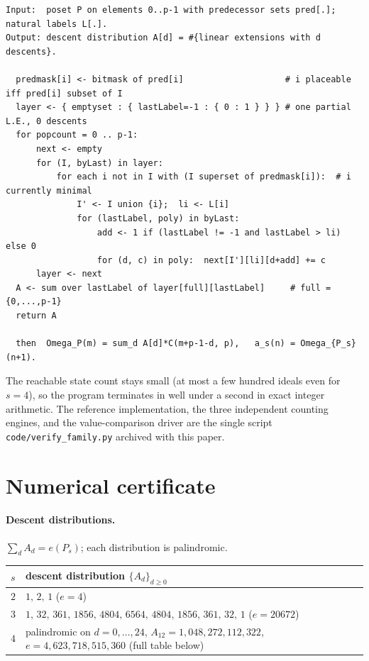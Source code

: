 \documentclass[11pt]{article}
\theoremstyle{plain}
\theoremstyle{definition}
\theoremstyle{remark}
\begin{document}
\begin{lstlisting}[caption={Descent distribution of a finite poset.},label={alg:desc}]
Input:  poset P on elements 0..p-1 with predecessor sets pred[.]; natural labels L[.].
Output: descent distribution A[d] = #{linear extensions with d descents}.

  predmask[i] <- bitmask of pred[i]                    # i placeable iff pred[i] subset of I
  layer <- { emptyset : { lastLabel=-1 : { 0 : 1 } } } # one partial L.E., 0 descents
  for popcount = 0 .. p-1:
      next <- empty
      for (I, byLast) in layer:
          for each i not in I with (I superset of predmask[i]):  # i currently minimal
              I' <- I union {i};  li <- L[i]
              for (lastLabel, poly) in byLast:
                  add <- 1 if (lastLabel != -1 and lastLabel > li) else 0
                  for (d, c) in poly:  next[I'][li][d+add] += c
      layer <- next
  A <- sum over lastLabel of layer[full][lastLabel]     # full = {0,...,p-1}
  return A

  then  Omega_P(m) = sum_d A[d]*C(m+p-1-d, p),   a_s(n) = Omega_{P_s}(n+1).
\end{lstlisting}

The reachable state count stays small (at most a few hundred ideals even for $s=4$), so the program
terminates in well under a second in exact integer arithmetic. The reference implementation, the
three independent counting engines, and the value-comparison driver are the single script
\texttt{code/verify\_family.py} archived with this paper.

\section{Numerical certificate}\label{app:cert}

\paragraph{Descent distributions.}
$\sum_d A_d=e(P_s)$; each distribution is palindromic.
\begin{center}\small
\begin{tabular}{l l}
\toprule
$s$ & descent distribution $\{A_d\}_{d\ge 0}$ \\
\midrule
$2$ & $1,\,2,\,1$ \quad($e=4$)\\
$3$ & $1,\,32,\,361,\,1856,\,4804,\,6564,\,4804,\,1856,\,361,\,32,\,1$ \quad($e=20672$)\\
$4$ & palindromic on $d=0,\dots,24$, $A_{12}=1{,}048{,}272{,}112{,}322$, $e=4{,}623{,}718{,}515{,}360$
(full table below)\\
\bottomrule
\end{tabular}
\end{center}
\end{document}
